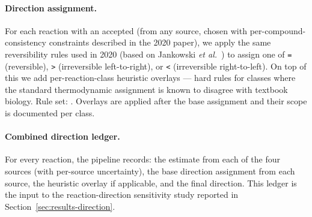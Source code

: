 \paragraph{Direction assignment.} For each reaction with an accepted \drG{}
(from any source, chosen with per-compound-consistency constraints described in
the 2020 paper), we apply the same reversibility rules used in 2020 (based on
Jankowski \textit{et al.}~\cite{jankowski2008}) to assign one of \texttt{=}
(reversible), \texttt{\textgreater} (irreversible left-to-right), or
\texttt{\textless} (irreversible right-to-left). On top of this we add
per-reaction-class heuristic overlays --- hard rules for classes where the
standard thermodynamic assignment is known to disagree with textbook biology.
Rule set: . Overlays are applied after the base assignment and their scope is
documented per class.

\paragraph{Combined direction ledger.} For every reaction, the pipeline records:
the \drG{} estimate from each of the four sources (with per-source uncertainty),
the base direction assignment from each source, the heuristic overlay if
applicable, and the final direction. This ledger is the input to the
reaction-direction sensitivity study reported in
Section~\ref{sec:results-direction}.
